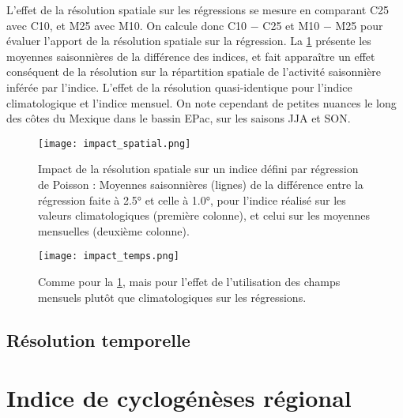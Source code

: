\documentclass[../main.tex]{subfiles}
\begin{document}
L'effet de la résolution spatiale sur les régressions se mesure en comparant C25 avec C10, et M25 avec M10. On calcule donc C10 $-$ C25 et M10 $-$ M25 pour
évaluer l'apport de la résolution spatiale sur la régression. La \cref{fig:impact_spatial} présente les moyennes saisonnières de la différence des indices, et
fait apparaître un effet conséquent de la résolution sur la répartition spatiale de l'activité saisonnière inférée par l'indice. L'effet de la résolution
quasi-identique pour l'indice climatologique et l'indice mensuel. On note cependant de petites nuances le long des côtes du Mexique dans le bassin EPac, sur les
saisons JJA et SON.

\begin{figure}[tb]
    \centering
    \texttt{[image: impact\_spatial.png]}
    \caption{Impact de la résolution spatiale sur un indice défini par régression de Poisson : Moyennes saisonnières (lignes) de la différence entre la
    régression faite à \ang{2.5} et celle à \ang{1.0}, pour l'indice réalisé sur les valeurs climatologiques (première colonne), et celui sur les moyennes
    mensuelles (deuxième colonne).}
    \label{fig:impact_spatial}
\end{figure}

\begin{figure}[tb]
    \centering
    \texttt{[image: impact\_temps.png]}
    \caption{Comme pour la \cref{fig:impact_spatial}, mais pour l'effet de l'utilisation des champs mensuels plutôt que climatologiques sur les régressions.}
    \label{fig:impact_temps}
\end{figure}

\subsection{Résolution temporelle}

\section{Indice de cyclogénèses régional}
\end{document}
